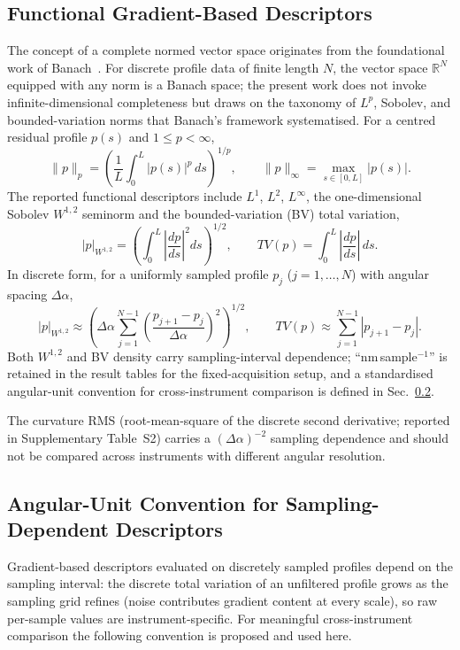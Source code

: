 \documentclass[review]{elsarticle}
\begin{document}
\subsection{Functional Gradient-Based Descriptors}
The concept of a complete normed vector space originates from the foundational work of Banach~\cite{Banach1932}. For discrete profile data of finite length $N$, the vector space $\mathbb{R}^N$ equipped with any norm is a Banach space; the present work does not invoke infinite-dimensional completeness but draws on the taxonomy of $L^p$, Sobolev, and bounded-variation norms that Banach's framework systematised. For a centred residual profile $p(s)$ and $1\leq p<\infty$,
\begin{equation}
\|p\|_{p}=\left(\frac{1}{L}\int_0^L |p(s)|^p\,ds\right)^{1/p}, \qquad
\|p\|_{\infty}=\max_{s\in[0,L]}|p(s)|.
\end{equation}
The reported functional descriptors include $L^1$, $L^2$, $L^\infty$, the one-dimensional Sobolev $W^{1,2}$ seminorm and the bounded-variation (BV) total variation,
\begin{equation}
|p|_{W^{1,2}}=\left(\int_0^L\left|\frac{dp}{ds}\right|^2 ds\right)^{\!1/2}, \qquad TV(p)=\int_0^L \left|\frac{dp}{ds}\right|\,ds.
\end{equation}
In discrete form, for a uniformly sampled profile $p_j$ ($j=1,\dots,N$) with angular spacing $\Delta\alpha$,
\begin{equation}
|p|_{W^{1,2}} \approx \left(\Delta\alpha\sum_{j=1}^{N-1}\left(\frac{p_{j+1}-p_j}{\Delta\alpha}\right)^2\right)^{\!1/2}, \qquad
TV(p) \approx \sum_{j=1}^{N-1}|p_{j+1}-p_j|.
\end{equation}
Both $W^{1,2}$ and BV density carry sampling-interval dependence; ``nm\,sample$^{-1}$'' is retained in the result tables for the fixed-acquisition setup, and a standardised angular-unit convention for cross-instrument comparison is defined in Sec.~\ref{sec:angular_units}.

The curvature RMS (root-mean-square of the discrete second derivative; reported in Supplementary Table~S2) carries a $(\Delta\alpha)^{-2}$ sampling dependence and should not be compared across instruments with different angular resolution.

\subsection{Angular-Unit Convention for Sampling-Dependent Descriptors}
\label{sec:angular_units}
Gradient-based descriptors evaluated on discretely sampled profiles depend on the sampling interval: the discrete total variation of an unfiltered profile grows as the sampling grid refines (noise contributes gradient content at every scale), so raw per-sample values are instrument-specific. For meaningful cross-instrument comparison the following convention is proposed and used here.
\end{document}
